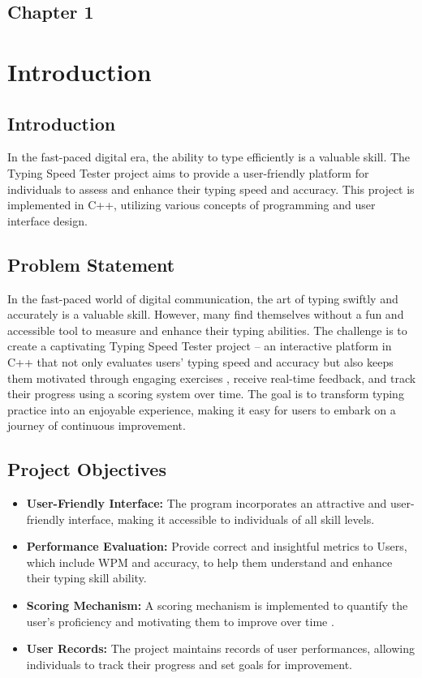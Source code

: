 \begin{center}
    \section*{\fontsize{20}{20}\selectfont Chapter 1}
\end{center}
\vspace{10mm}
\section{Introduction}
\subsection{Introduction}
In the fast-paced digital era, the ability to type efficiently is a valuable skill. The Typing Speed Tester project aims to provide a user-friendly platform for individuals to assess and enhance their typing speed and accuracy. This project is implemented in C++, utilizing various concepts of programming and user interface design.


\subsection{Problem Statement}
In the fast-paced world of digital communication, the art of typing swiftly and accurately is a valuable skill. However, many find themselves without a fun and accessible tool to measure and enhance their typing abilities. The challenge is to create a captivating Typing Speed Tester project – an interactive platform in C++ that not only evaluates users' typing speed and accuracy but also keeps them motivated through engaging exercises , receive real-time feedback, and track their progress using a scoring system over time. The goal is to transform typing practice into an enjoyable experience, making it easy for users to embark on a journey of continuous improvement.


\subsection{Project Objectives}

 \begin{itemize}
    \item{\textbf{User-Friendly Interface:}} The program incorporates an attractive and user-friendly interface, making it accessible to individuals of all skill levels.
    \item{\textbf{Performance Evaluation:}} Provide correct and insightful metrics to Users, which include WPM and accuracy, to help them understand and enhance their typing skill ability.
    \item{\textbf{Scoring Mechanism:}} A scoring mechanism is implemented to quantify the user's proficiency and motivating them to improve over time .
    \item{\textbf{User Records:}} The project maintains records of user performances, allowing individuals to track their progress and set goals for improvement.
 \end{itemize}
 
